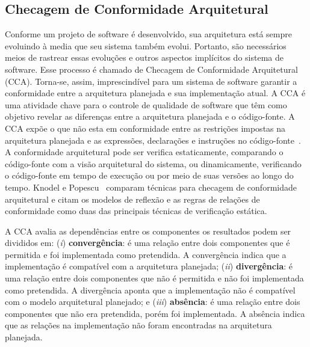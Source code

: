 \documentclass[12pt]{article}
\begin{document}
\subsection{Checagem de Conformidade Arquitetural}

Conforme um projeto de software é desenvolvido, sua arquitetura está sempre evoluindo à media que seu sistema também evolui. Portanto, são necessários meios de rastrear essas evoluções e outros aspectos implícitos do sistema de software. Esse processo é chamado  de Checagem de Conformidade Arquitetural (CCA). Torna-se, assim, imprescindível para um sistema de software garantir a conformidade entre a arquitetura planejada e sua implementação atual. A CCA é uma atividade chave para o controle de qualidade de software que têm como objetivo revelar as diferenças entre a arquitetura planejada e o código-fonte. A CCA expõe o que não esta em conformidade entre as restrições impostas na arquitetura planejada e as expressões, declarações e instruções no código-fonte~\cite{Knodel_2007}. A conformidade arquitetural pode ser verifica estaticamente, comparando o código-fonte com a visão arquitetural do sistema, ou dinamicamente, verificando o código-fonte em tempo de execução ou por meio de suas versões ao longo do tempo. Knodel e Popescu~\cite{Knodel_2007} comparam técnicas para checagem de conformidade arquitetural e citam os modelos de reflexão e as regras de relações de conformidade como duas das principais técnicas de verificação estática. 

A CCA avalia as dependências entre os componentes os resultados podem ser divididos em: (\textit{i}) \textbf{convergência}: é uma relação entre dois componentes que é permitida e foi implementada como pretendida. A convergência indica que a implementação é compatível com a arquitetura planejada; (\textit{ii}) \textbf{divergência}: é uma relação entre dois componentes que não é permitida e não foi implementada como pretendida. A divergência aponta que a implementação não é compatível com o modelo arquitetural planejado; e (\textit{iii}) \textbf{absência}: é uma relação entre dois componentes que não era pretendida, porém foi implementada. A absência indica que as relações na implementação não foram encontradas na arquitetura planejada.
\end{document}
